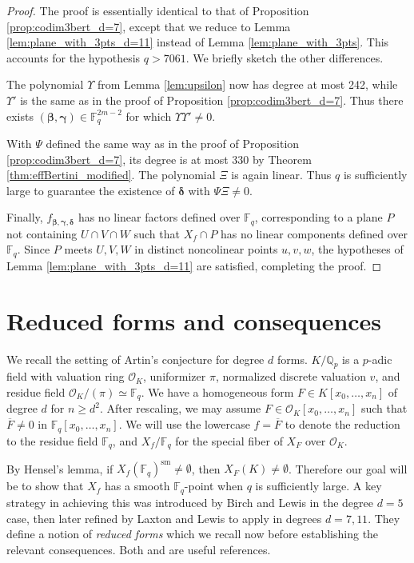 \documentclass{amsart}
\newcommand{\Q}{\mathbb{Q}}
\newcommand{\F}{\mathbb{F}}
\renewcommand{\O}{\mathcal{O}}
\newcommand{\sm}{\mathrm{sm}}
\renewcommand{\v}{\beta}
\newcommand{\w}{\gamma}
\newcommand{\z}{\delta}
\newcommand{\bv}{\boldsymbol{\v}}
\newcommand{\bw}{\boldsymbol{\w}}
\newcommand{\bz}{\boldsymbol{\z}}
\newcommand{\fvwz}{f_{\bv, \bw, \bz}}
\theoremstyle{definition}
\numberwithin{equation}{section}
\numberwithin{table}{section}
\newcommand{\qbound}[1]{{\color{cyan}$q > {#1}$}}
\renewcommand{\qbound}[1]{{$q > {#1}$}}
\begin{document}
\begin{proof}
    The proof is essentially identical to that of Proposition \ref{prop:codim3bert_d=7}, except that we reduce to Lemma \ref{lem:plane_with_3pts_d=11} instead of Lemma \ref{lem:plane_with_3pts}. This accounts for the hypothesis \qbound{7061}. We briefly sketch the other differences.
    
    The polynomial $\Upsilon$ from Lemma \ref{lem:upsilon} now has degree at most 242, while $\Upsilon'$ is the same as in the proof of Proposition \ref{prop:codim3bert_d=7}. Thus there exists $(\bv,\bw) \in \F_q^{2m-2}$ for which $\Upsilon\Upsilon' \neq 0$. 
    
    With $\Psi$ defined the same way as in the proof of Proposition \ref{prop:codim3bert_d=7}, its degree is at most 330 by Theorem \ref{thm:effBertini_modified}. The polynomial $\Xi$ is again linear. Thus $q$ is sufficiently large to guarantee the existence of $\bz$ with $\Psi \Xi \neq 0$. 

    Finally, $\fvwz$ has no linear factors defined over $\F_q$, corresponding to a plane $P$ not containing $U \cap V \cap W$ such that $X_f \cap P$ has no linear components defined over $\F_q$. Since $P$ meets $U, V, W$ in distinct noncolinear points $u,v,w$, the hypotheses of Lemma \ref{lem:plane_with_3pts_d=11} are satisfied, completing the proof.
\end{proof}

\section{Reduced forms and consequences}
\label{sec:reduced_forms_and_consequences}

We recall the setting of Artin's conjecture for degree $d$ forms. $K/\Q_p$ is a $p$-adic field with valuation ring $\O_K$, uniformizer $\pi$, normalized discrete valuation $v$, and residue field $\O_K/(\pi) \simeq \F_q$. We have a homogeneous form $F \in K[x_0, \ldots, x_n]$ of degree $d$ for $n \geq d^2$. After rescaling, we may assume $F \in \O_K[x_0, \ldots, x_n]$ such that $\overline{F} \neq 0$ in $\F_q[x_0, \ldots, x_n]$. We will use the lowercase $f = \overline{F}$ to denote the reduction to the residue field $\F_q$, and $X_f/\F_q$ for the special fiber of $X_F$ over $\O_K$.

By Hensel's lemma, if $X_f(\F_q)^{\sm} \neq \emptyset$, then $X_F(K) \neq \emptyset$. Therefore our goal will be to show that $X_f$ has a smooth $\F_q$-point when $q$ is sufficiently large. A key strategy in achieving this was introduced by Birch and Lewis \cite{BirchLewis1959} in the degree $d=5$ case, then later refined by Laxton and Lewis \cite{LaxtonLewis1965} to apply in degrees $d=7, 11$. They define a notion of \textit{reduced forms} which we recall now before establishing the relevant consequences. Both \cite{LaxtonLewis1965} and \cite[\S 4]{LeepYeomans1996_quintic_forms} are useful references.
\end{document}
